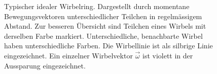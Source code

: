 \begin{figure}
\centering
{}
\caption{Typischer idealer Wirbelring.
Dargestellt durch momentane Bewegungsvektoren unterschiedlicher Teilchen in regelmässigem Abstand.
Zur besseren Übersicht sind Teilchen eines Wirbels mit derselben Farbe markiert.
Unterschiedliche, benachbarte Wirbel haben unterschiedliche Farben.
Die Wirbellinie ist als silbrige Linie eingezeichnet.
Ein einzelner Wirbelvektor \(\vec{\omega}\) ist violett in der Aussparung eingezeichnet.\label{Wirbelringe:fig:generell}}
\end{figure}